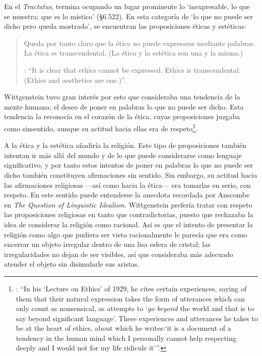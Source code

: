 En el \emph{Tractatus}, termina ocupando un lugar prominente lo \enquote*{inexpresable, lo que se muestra; que es lo místico} (\S6.522). En esta categoría de `lo que no puede ser dicho pero queda mostrado', se encuentran las proposiciones éticas y estéticas: \blockquote[{\Cite[\S6.421]{wittgenstein1922tractatus}}: \enquote{It is clear that ethics cannot be expressed. Ethics is transcendental. (Ethics and aesthetics are one.)}.]{Queda por tanto claro que la ética no puede expresarse mediante palabras. La ética es transcendental. (La ética y la estética son una y la misma.)}. Wittgenstein tuvo gran interés por esto que consideraba una tendencia de la mente humana: el deseo de poner en palabras lo que no puede ser dicho. Esta tendencia la reconocía en el corazón de la ética, cuyas proposiciones juzgaba como sinsentido, aunque su actitud hacia ellas era de respeto\footnote{\cite[Cf.][211]{teichmann2008ans}: \enquote{In his `Lecture on Ethics' of 1929, he cites certain experiences, saying of them that their natural expression takes the form of utterances which can only count as nonsensical, as attempts to `\emph{go beyond} the world and that is to say beyond significant language'. These experiences and utterances he takes to be at the heart of ethics, about which he writes:`it is a document of a tendency in the human mind which I personally cannot help respecting deeply and I would not for my life ridicule it'}.}.

A la ética y la estética añadiría la religión. Este tipo de proposiciones también intentan ir más allá del mundo y de lo que puede considerarse como lenguaje significativo, y por tanto estos intentos de poner en palabras lo que no puede ser dicho también constituyen afirmaciones sin sentido. Sin embargo, su actitud hacia las afirmaciones religiosas ---así como hacia la ética--- era tomarlas en serio, con respeto. En este sentido puede entenderse la anecdota recordada por Anscombe en \emph{The Question of Linguistic Idealism}. Wittgenstein prefería tratar con respeto las proposiciones religiosas en tanto que contradictorias, puesto que rechazaba la idea de considerar la religión como racional. Así es que el intento de presentar la religión como algo que pudiera ser visto racionalmente le parecía que era como encerrar un objeto irregular dentro de una lisa esfera de cristal; las irregularidades no dejan de ser visibles, así que consideraba más adecuado atender el objeto sin disimularle sus aristas.

